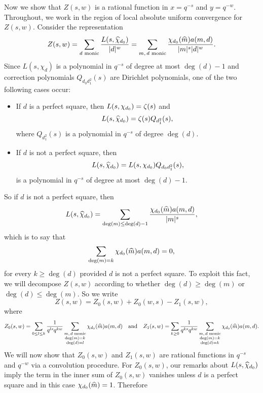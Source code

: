 \documentclass[12pt,reqno,oneside]{amsart}
\begin{document}
    Now we show that $Z(s,w)$ is a rational function in $x = q^{-s}$ and $y = q^{-w}$. Throughout, we work in the region of local absolute uniform convergence for $Z(s,w)$. Consider the representation
    \[
        Z(s,w) = \sum_{\text{$d$ monic}}\frac{L(s,\widehat{\chi}_{d_{0}})}{|d|^{w}} = \sum_{\text{$m,d$ monic}}\frac{\chi_{d_{0}}(\widehat{m})a(m,d)}{|m|^{s}|d|^{w}}.
    \]
    Since $L(s,\chi_{d})$ is a polynomial in $q^{-s}$ of degree at most $\deg(d)-1$ and correction polynomials $Q_{d_{0}d_{1}^{2}}(s)$ are Dirichlet polynomials, one of the two following cases occur:
    \begin{itemize}
        \item If $d$ is a perfect square, then $L(s,\chi_{d_{0}}) = \zeta(s)$ and
        \[
            L(s,\widehat{\chi}_{d_{0}}) = \zeta(s)Q_{d_{1}^{2}}(s),
        \]
        where $Q_{d_{1}^{2}}(s)$ is a polynomial in $q^{-s}$ of degree $\deg(d)$.
        \item If $d$ is not a perfect square, then
        \[
            L(s,\widehat{\chi}_{d_{0}}) = L(s,\chi_{d_{0}})Q_{d_{0}d_{1}^{2}}(s),
        \]
        is a polynomial in $q^{-s}$ of degree at most $\deg(d)-1$.
    \end{itemize}
    So if $d$ is not a perfect square, then
    \[
        L(s,\widehat{\chi}_{d_{0}}) = \sum_{\deg(m) \le \deg(d)-1}\frac{\chi_{d_{0}}(\widehat{m})a(m,d)}{|m|^{s}},
    \]
    which is to say that
    \[
        \sum_{\deg(m) = k}\chi_{d_{0}}(\widehat{m})a(m,d) = 0,
    \]
    for every $k \ge \deg(d)$ provided $d$ is not a perfect square. To exploit this fact, we will decompose $Z(s,w)$ according to whether $\deg(d) \ge \deg(m)$ or $\deg(d) \le \deg(m)$. So we write
    \[
        Z(s,w) = Z_{0}(s,w)+Z_{0}(w,s)-Z_{1}(s,w),
    \]
    where
    \[
        Z_{0}(s,w) = \sum_{0 \le l \le k}\frac{1}{q^{ls}q^{kw}}\sum_{\substack{\text{$m,d$ monic} \\ \deg(m) = k \\ \deg(d) = l}}\chi_{d_{0}}(\widehat{m})a(m,d) \quad \text{and} \quad Z_{1}(s,w) = \sum_{k \ge 0}\frac{1}{q^{ks}q^{kw}}\sum_{\substack{\text{$m,d$ monic} \\ \deg(m) = k \\ \deg(d) = k}}\chi_{d_{0}}(\widehat{m})a(m,d).
    \]
    We will now show that $Z_{0}(s,w)$ and $Z_{1}(s,w)$ are rational functions in $q^{-s}$ and $q^{-w}$ via a convolution procedure. For $Z_{0}(s,w)$, our remarks about $L(s,\widehat{\chi}_{d_{0}})$ imply the term in the inner sum of $Z_{0}(s,w)$ vanishes unless $d$ is a perfect square and in this case $\chi_{d_{0}}(\widehat{m}) = 1$. Therefore
\end{document}

